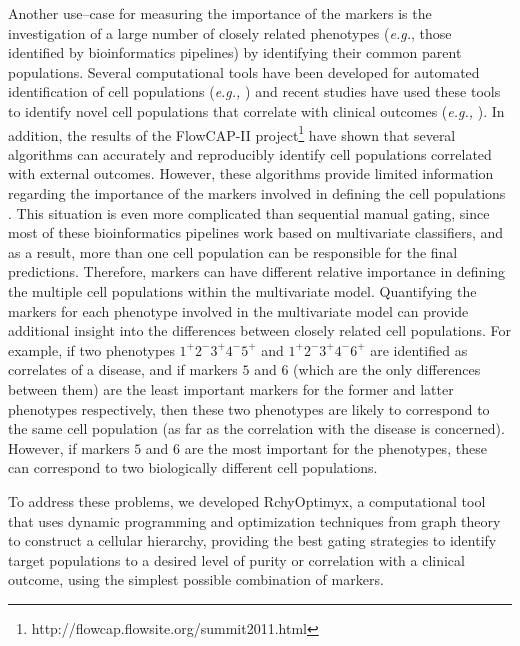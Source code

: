 Another use--case for measuring the importance of the markers is  the investigation of a large number of closely related phenotypes (\emph{e.g.}, those identified by bioinformatics pipelines) by identifying their common parent populations.
Several computational tools have been developed for automated identification of cell populations (\emph{e.g.,} \cite{lo2008automated, finak2009merging, pyne2009automated, chan2008statistical, naumann2010curvhdr,  zare2010data, qian2010elucidation, sugar2010misty,  Aghaeepour2010Rapid, bendall2011single, qiu2011extracting}) and 
recent studies have used these tools to identify novel cell populations that correlate with clinical outcomes (\emph{e.g.,} \cite{Aghaeepour2012,zare2012automated,costa2010automated,roederer2011spice,bashashati2012b}).
In addition, the results of the FlowCAP-II project\footnote{http://flowcap.flowsite.org/summit2011.html}  have shown that several algorithms can accurately and reproducibly identify  cell populations correlated with external outcomes. %
However, these algorithms provide limited information regarding the importance of the markers involved in defining the cell populations \cite{Aghaeepour2012,chan2010optimization}. 
This situation is even more complicated than sequential manual gating, since most of these bioinformatics pipelines work based on multivariate classifiers, and as a result, more than one cell population can be responsible for the final predictions.
Therefore, markers can have different relative importance in defining the multiple cell populations within the multivariate model.
Quantifying the markers for each phenotype involved in the multivariate model can provide additional insight into the differences between closely related cell populations.
For example, if %
 two phenotypes $1^+2^-3^+4^-5^+$ and $1^+2^-3^+4^-6^+$ are identified as correlates of a disease, and if markers $5$ and $6$ (which are the only differences between them) are the least important markers for the former and latter phenotypes respectively, then these two phenotypes are likely to correspond to the same cell population (as far as the correlation with the disease is concerned).
However, if markers $5$ and $6$ are the most important for the phenotypes, these can correspond to two biologically different cell populations.

To address these problems, we developed RchyOptimyx, a computational tool that uses dynamic programming and optimization techniques from graph theory to construct a cellular hierarchy, providing the best gating strategies to identify target populations to a desired level of purity or correlation with a clinical outcome, using the simplest possible combination of markers. 

